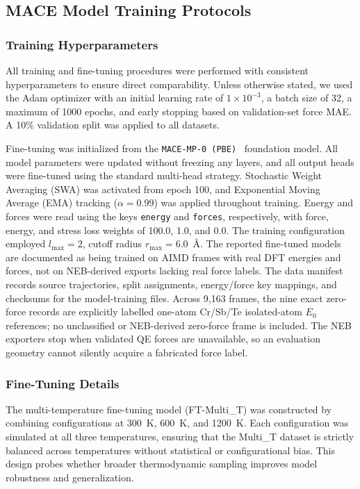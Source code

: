 \documentclass[pdflatex,sn-mathphys-num]{sn-jnl}%
\theoremstyle{thmstyleone}%
\theoremstyle{thmstyletwo}%
\theoremstyle{thmstylethree}%
\begin{document}
\subsection{MACE Model Training Protocols}

\subsubsection{Training Hyperparameters}
All training and fine-tuning procedures were performed with consistent hyperparameters to ensure direct comparability. Unless otherwise stated, we used the Adam optimizer with an initial learning rate of $1\times10^{-3}$, a batch size of 32, a maximum of 1000 epochs, and early stopping based on validation-set force MAE. A 10\% validation split was applied to all datasets.

Fine-tuning was initialized from the \texttt{MACE-MP-0 (PBE)}~\cite{batatia_mace_nodate} foundation model. All model parameters were updated without freezing any layers, and all output heads were fine-tuned using the standard multi-head strategy. Stochastic Weight Averaging (SWA) was activated from epoch 100, and Exponential Moving Average (EMA) tracking ($\alpha=0.99$) was applied throughout training. Energy and forces were read using the keys \texttt{energy} and \texttt{forces}, respectively, with force, energy, and stress loss weights of 100.0, 1.0, and 0.0. The training configuration employed $l_{\max}=2$, cutoff radius $r_{\max}=6.0$~Å.
The reported fine-tuned models are documented as being trained on AIMD frames with real DFT energies and forces, not on NEB-derived exports lacking real force labels. The data manifest records source trajectories, split assignments, energy/force key mappings, and checksums for the model-training files. Across 9,163 frames, the nine exact zero-force records are explicitly labelled one-atom Cr/Sb/Te isolated-atom $E_0$ references; no unclassified or NEB-derived zero-force frame is included. The NEB exporters stop when validated QE forces are unavailable, so an evaluation geometry cannot silently acquire a fabricated force label.


\subsubsection{Fine-Tuning Details}
The multi-temperature fine-tuning model (FT-Multi\_T) was constructed by combining configurations at 300~K, 600~K, and 1200~K. Each configuration was simulated at all three temperatures, ensuring that the Multi\_T dataset is strictly balanced across temperatures without statistical or configurational bias. This design probes whether broader thermodynamic sampling improves model robustness and generalization.
\end{document}
